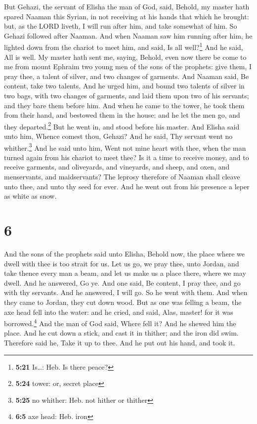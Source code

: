  But Gehazi, the servant of Elisha the man of God, said,
Behold, my master hath spared Naaman this Syrian, in not receiving at
his hands that which he brought: but, as the LORD liveth, I will run
after him, and take somewhat of him.  So Gehazi followed
after Naaman. And when Naaman saw him running after him, he lighted down
from the chariot to meet him, and said, Is all well?\footnote{\textbf{5:21}
  Is\ldots: Heb. Is there peace?}  And he said, All is
well. My master hath sent me, saying, Behold, even now there be come to
me from mount Ephraim two young men of the sons of the prophets: give
them, I pray thee, a talent of silver, and two changes of garments.
 And Naaman said, Be content, take two talents. And he
urged him, and bound two talents of silver in two bags, with two changes
of garments, and laid them upon two of his servants; and they bare them
before him.  And when he came to the tower, he took them
from their hand, and bestowed them in the house: and he let the men go,
and they departed.\footnote{\textbf{5:24} tower: or, secret place}
 But he went in, and stood before his master. And Elisha
said unto him, Whence comest thou, Gehazi? And he said, Thy servant went
no whither.\footnote{\textbf{5:25} no whither: Heb. not hither or
  thither}  And he said unto him, Went not mine heart
with thee, when the man turned again from his chariot to meet thee? Is
it a time to receive money, and to receive garments, and oliveyards, and
vineyards, and sheep, and oxen, and menservants, and maidservants?
 The leprosy therefore of Naaman shall cleave unto thee,
and unto thy seed for ever. And he went out from his presence a leper as
white as snow.

\hypertarget{section-5}{%
\section{6}\label{section-5}}

 And the sons of the prophets said unto Elisha, Behold
now, the place where we dwell with thee is too strait for us.
 Let us go, we pray thee, unto Jordan, and take thence
every man a beam, and let us make us a place there, where we may dwell.
And he answered, Go ye.  And one said, Be content, I pray
thee, and go with thy servants. And he answered, I will go.
 So he went with them. And when they came to Jordan, they
cut down wood.  But as one was felling a beam, the axe
head fell into the water: and he cried, and said, Alas, master! for it
was borrowed.\footnote{\textbf{6:5} axe head: Heb. iron} 
And the man of God said, Where fell it? And he shewed him the place. And
he cut down a stick, and cast it in thither; and the iron did swim.
 Therefore said he, Take it up to thee. And he put out his
hand, and took it.

